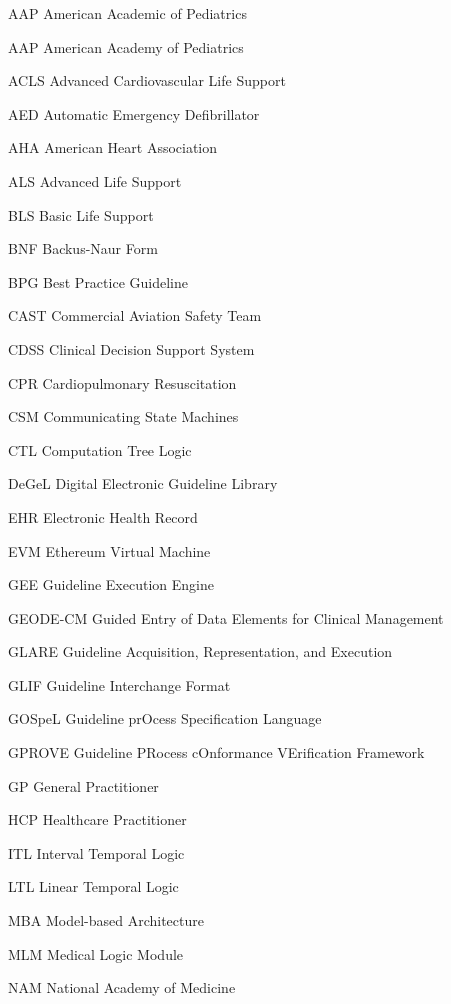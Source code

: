 \documentclass{uiucthesis2021}
\begin{document}
\begin{abbrevlist}
\item[AAP]      American Academic of Pediatrics
\item[AAP]      American Academy of Pediatrics
\item[ACLS]     Advanced Cardiovascular Life Support
\item[AED]      Automatic Emergency Defibrillator
\item[AHA]      American Heart Association
\item[ALS]      Advanced Life Support
\item[BLS]      Basic Life Support
\item[BNF]      Backus-Naur Form
\item[BPG]      Best Practice Guideline
\item[CAST]     Commercial Aviation Safety Team
\item[CDSS]     Clinical Decision Support System
\item[CPR]      Cardiopulmonary Resuscitation
\item[CSM]      Communicating State Machines
\item[CTL]      Computation Tree Logic
\item[DeGeL]    Digital Electronic Guideline Library
\item[EHR]      Electronic Health Record
\item[EVM]      Ethereum Virtual Machine
\item[GEE]      Guideline Execution Engine
\item[GEODE-CM] Guided Entry of Data Elements for Clinical Management
\item[GLARE]    Guideline Acquisition, Representation, and Execution
\item[GLIF]     Guideline Interchange Format
\item[GOSpeL]   Guideline prOcess Specification Language
\item[GPROVE]   Guideline PRocess cOnformance VErification Framework
\item[GP]       General Practitioner
\item[HCP]      Healthcare Practitioner
\item[ITL]      Interval Temporal Logic
\item[LTL]      Linear Temporal Logic
\item[MBA]      Model-based Architecture
\item[MLM]      Medical Logic Module
\item[NAM]      National Academy of Medicine

\end{abbrevlist}
\end{document}
